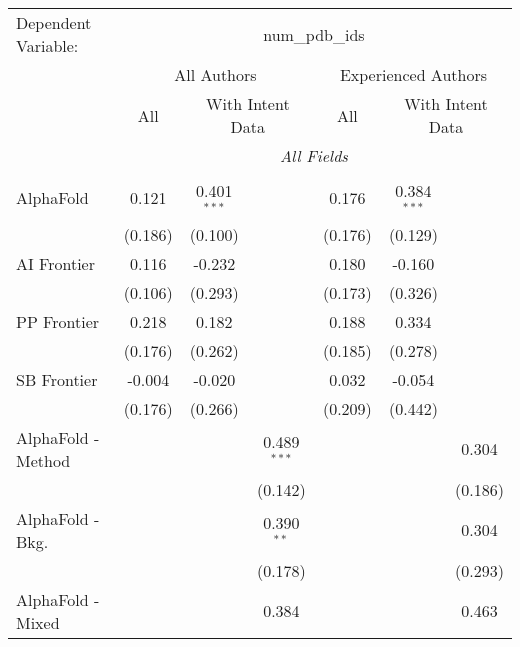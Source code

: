 \begingroup
\centering
\begin{tabular}{lcccccc}
   \tabularnewline \midrule \midrule
   Dependent Variable: & \multicolumn{6}{c}{num\_pdb\_ids}\\
 & \multicolumn{3}{c}{All Authors} & \multicolumn{3}{c}{Experienced Authors} \\
\cmidrule(lr){2-4} \cmidrule(lr){5-7}
 & \multicolumn{1}{c}{All} & \multicolumn{2}{c}{With Intent Data} & \multicolumn{1}{c}{All} & \multicolumn{2}{c}{With Intent Data} \\
\cmidrule(lr){2-2} \cmidrule(lr){3-4} \cmidrule(lr){5-5} \cmidrule(lr){6-7}
 & \multicolumn{6}{c}{\textit{All Fields}} \\ \\
   AlphaFold            & 0.121   & 0.401$^{***}$ &                & 0.176   & 0.384$^{***}$ &   \\   
                        & (0.186) & (0.100)       &                & (0.176) & (0.129)       &   \\   
   AI Frontier          & 0.116   & -0.232        &                & 0.180   & -0.160        &   \\   
                        & (0.106) & (0.293)       &                & (0.173) & (0.326)       &   \\   
   PP Frontier          & 0.218   & 0.182         &                & 0.188   & 0.334         &   \\   
                        & (0.176) & (0.262)       &                & (0.185) & (0.278)       &   \\   
   SB Frontier          & -0.004  & -0.020        &                & 0.032   & -0.054        &   \\   
                        & (0.176) & (0.266)       &                & (0.209) & (0.442)       &   \\   
   AlphaFold - Method   &         &               & 0.489$^{***}$  &         &               & 0.304\\   
                        &         &               & (0.142)        &         &               & (0.186)\\   
   AlphaFold - Bkg.     &         &               & 0.390$^{**}$   &         &               & 0.304\\   
                        &         &               & (0.178)        &         &               & (0.293)\\   
   AlphaFold - Mixed    &         &               & 0.384          &         &               & 0.463\\   

\end{tabular}
